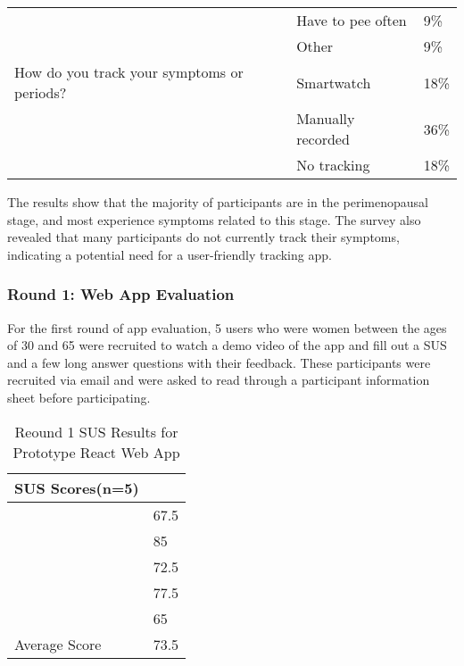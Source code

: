 \begin{table}[h!!]
{\begin{tabular}{lll}
                                                                                        & Have to pee often      & 9\%  \\
                                                                                        & Other                  & 9\%  \\
        How do you track your symptoms or periods?                                      & Smartwatch             & 18\% \\
                                                                                        & Manually recorded      & 36\% \\
                                                                                        & No tracking            & 18\% \\ \hline
        \end{tabular}
    }
  \end{table}

The results show that the majority of participants are in the perimenopausal stage, and most experience symptoms related to this stage. The survey also revealed that many participants do not currently track their symptoms, indicating a potential need for a user-friendly tracking app.

\subsubsection{Round 1: Web App Evaluation}
For the first round of app evaluation, 5 users who were women between the ages of 30 and 65 were recruited to watch a demo video of the app and fill out a SUS and a few long answer questions with their feedback. These participants were recruited via email and were asked to read through a participant information sheet before participating. 

\begin{table}[h!!]
    \caption{Reound 1 SUS Results for Prototype React Web App}
    \label{table:proto-sus}
    \begin{tabular}{ll}
    \hline
    SUS Scores(n=5) &      \\ \hline
                    & 67.5 \\
                    & 85   \\
                    & 72.5 \\
                    & 77.5 \\
                    & 65   \\
        Average Score & 73.5
    \end{tabular}
    \end{table}

